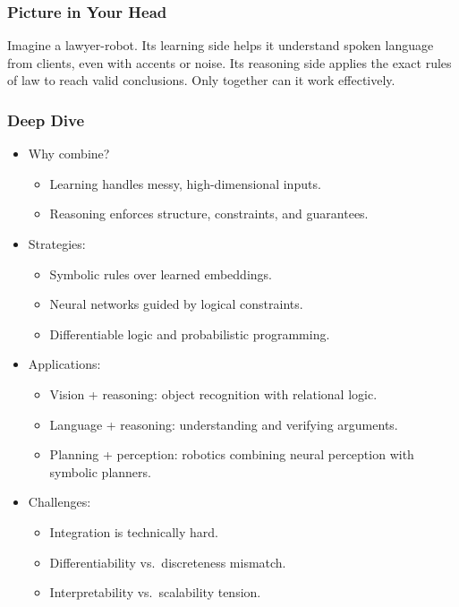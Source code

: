 \documentclass[
  letterpaper,
  DIV=11,
  numbers=noendperiod]{scrreprt}
\providecommand{\tightlist}{%
  \setlength{\itemsep}{0pt}\setlength{\parskip}{0pt}}
\begin{document}
\subsubsection{Picture in Your Head}\label{picture-in-your-head-57}

Imagine a lawyer-robot. Its learning side helps it understand spoken
language from clients, even with accents or noise. Its reasoning side
applies the exact rules of law to reach valid conclusions. Only together
can it work effectively.

\subsubsection{Deep Dive}\label{deep-dive-57}

\begin{itemize}
\item
  Why combine?

  \begin{itemize}
  \tightlist
  \item
    Learning handles messy, high-dimensional inputs.
  \item
    Reasoning enforces structure, constraints, and guarantees.
  \end{itemize}
\item
  Strategies:

  \begin{itemize}
  \tightlist
  \item
    Symbolic rules over learned embeddings.
  \item
    Neural networks guided by logical constraints.
  \item
    Differentiable logic and probabilistic programming.
  \end{itemize}
\item
  Applications:

  \begin{itemize}
  \tightlist
  \item
    Vision + reasoning: object recognition with relational logic.
  \item
    Language + reasoning: understanding and verifying arguments.
  \item
    Planning + perception: robotics combining neural perception with
    symbolic planners.
  \end{itemize}
\item
  Challenges:

  \begin{itemize}
  \tightlist
  \item
    Integration is technically hard.
  \item
    Differentiability vs.~discreteness mismatch.
  \item
    Interpretability vs.~scalability tension.
  \end{itemize}
\end{itemize}
\end{document}
